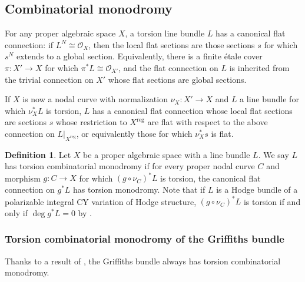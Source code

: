 \documentclass{amsart}
\theoremstyle{definition}
\newtheorem{defn}[theorem]{Definition}
\theoremstyle{remark}
\def\cO{\mathcal{O}}
\def\reg{\mathrm{reg}}
\numberwithin{equation}{section}
\begin{document}



\subsection{Combinatorial monodromy}\label{subsect:combin monodromy}

For any proper algebraic space $X$, a torsion line bundle $L$ has a canonical flat connection:  if $L^N\cong \cO_X$, then the local flat sections are those sections $s$ for which $s^N$ extends to a global section.  Equivalently, there is a finite \'etale cover $\pi:X'\to X$ for which $\pi^*L\cong \cO_{X'}$, and the flat connection on $L$ is inherited from the trivial connection on $X'$ whose flat sections are global sections.

If $X$ is now a nodal curve with normalization $\nu_X:X'\to X$ and $L$ a line bundle for which $\nu_X^*L$ is torsion, $L$ has a canonical flat connection whose local flat sections are sections $s$ whose restriction to $X^\reg$ are flat with respect to the above connection on $L|_{X^\reg}$, or equivalently those for which $\nu_X^*s$ is flat.





 
\begin{defn}\label{defn:torsion combo}
    Let $X$ be a proper algebraic space with a line bundle $L$.  We say $L$ has torsion combinatorial monodromy if for every proper nodal curve $C$ and morphism $g:C\to X$ for which $(g\circ \nu_C)^*L$ is torsion, the canonical flat connection on $g^*L$ has torsion monodromy.  Note that if $L$ is a Hodge bundle of a polarizable integral CY variation of Hodge structure, $(g\circ\nu_C)^*L$ is torsion if and only if $\deg g^*L=0$ by .
\end{defn}


\subsubsection{Torsion combinatorial monodromy of the Griffiths bundle}\label{subsect:Griffths torsion}
Thanks to a result of \cite{GGRtorsion}, the Griffiths bundle always has torsion combinatorial monodromy.
\end{document}
